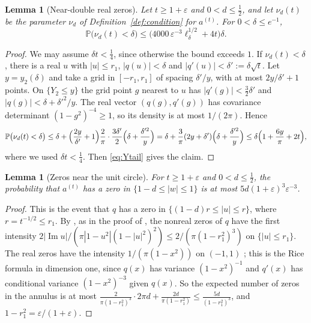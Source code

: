 \documentclass[11pt]{amsart}
\newtheorem{lemma}[theorem]{Lemma}
\theoremstyle{definition}
\theoremstyle{remark}
\numberwithin{equation}{section}
\newcommand{\PP}{\mathbb{P}}
\newcommand{\eps}{\varepsilon}
\DeclareMathOperator{\im}{Im}
\begin{document}
\begin{lemma}[Near-double real zeros]\label{lem:nu-small}
Let $t\ge1+\eps$ and $0<d\le\frac12$, and let $\nu_d(t)$ be the parameter $\nu_d$ of Definition~\ref{def:condition} for $a^{(t)}$. For $0<\delta\le e^{-1}$,
\[
\PP\bigl(\nu_d(t)<\delta\bigr)\le\bigl(4000\,\eps^{-3}\ell_\delta^{1/2}+4t\bigr)\delta .
\]
\end{lemma}

\begin{proof}
We may assume $\delta t<\frac14$, since otherwise the bound exceeds $1$. If $\nu_d(t)<\delta$, there is a real $u$ with $|u|\le r_1$, $|q(u)|<\delta$ and $|q'(u)|<\delta':=\delta\sqrt t$. Let $y=y_2(\delta)$ and take a grid in $[-r_1,r_1]$ of spacing $\delta'/y$, with at most $2y/\delta'+1$ points. On $\{Y_2\le y\}$ the grid point $g$ nearest to $u$ has $|q'(g)|<\frac32\delta'$ and $|q(g)|<\delta+\delta'^2/y$. The real vector $(q(g),q'(g))$ has covariance determinant $(1-g^2)^{-4}\ge1$, so its density is at most $1/(2\pi)$. Hence
\[
\PP\bigl(\nu_d(t)<\delta\bigr)\le\delta+\Bigl(\frac{2y}{\delta'}+1\Bigr)\frac2\pi\cdot\frac{3\delta'}2\Bigl(\delta+\frac{\delta'^2}y\Bigr)=\delta+\frac3\pi(2y+\delta')\Bigl(\delta+\frac{\delta'^2}y\Bigr)\le\delta\Bigl(1+\frac{6y}\pi+2t\Bigr),
\]
where we used $\delta t<\frac14$. Then \eqref{eq:Ytail} gives the claim.
\end{proof}

\begin{lemma}[Zeros near the unit circle]\label{lem:annulus}
For $t\ge1+\eps$ and $0<d\le\frac12$, the probability that $a^{(t)}$ has a zero in $\{1-d\le|w|\le1\}$ is at most $5d(1+\eps)^3\eps^{-3}$.
\end{lemma}

\begin{proof}
This is the event that $q$ has a zero in $\{(1-d)r\le|u|\le r\}$, where $r=t^{-1/2}\le r_1$. By \cite[Theorem~2.7]{MS}, as in the proof of \cite[Lemma~\ref{M-lem:pairs}]{Main}, the nonreal zeros of $q$ have the first intensity $2|\im u|/(\pi|1-u^2|(1-|u|^2)^2)\le2/(\pi(1-r_1^2)^3)$ on $\{|u|\le r_1\}$. The real zeros have the intensity $1/(\pi(1-x^2))$ on $(-1,1)$ \cite{Ka}; this is the Rice formula \cite[Theorem~6.2]{AW} in dimension one, since $q(x)$ has variance $(1-x^2)^{-1}$ and $q'(x)$ has conditional variance $(1-x^2)^{-3}$ given $q(x)$.
So the expected number of zeros in the annulus is at most $\frac{2}{\pi(1-r_1^2)^3}\cdot2\pi d+\frac{2d}{\pi(1-r_1^2)}\le\frac{5d}{(1-r_1^2)^3}$, and $1-r_1^2=\eps/(1+\eps)$.
\end{proof}
\end{document}
